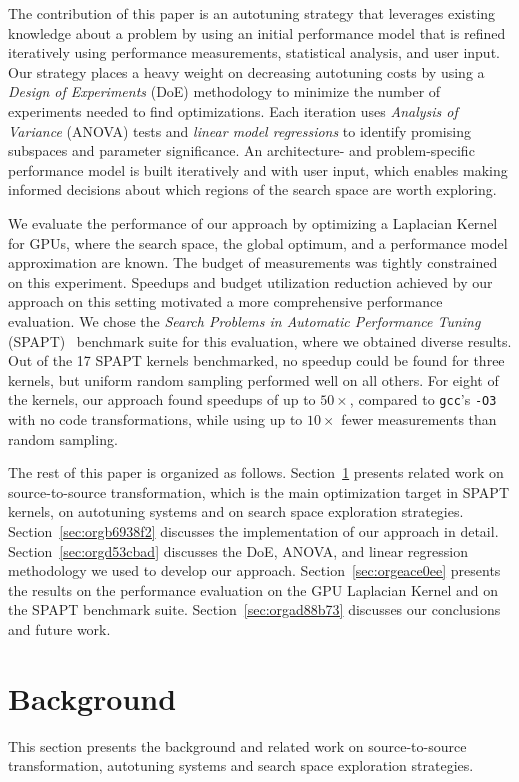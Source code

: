 \documentclass[conference]{IEEEtran}
\begin{document}
The contribution of this paper is an autotuning strategy that leverages existing
knowledge about a problem by using  an initial performance model that is refined
iteratively  using  performance  measurements, statistical  analysis,  and  user
input. Our  strategy places  a heavy  weight on  decreasing autotuning  costs by
using  a \emph{Design  of  Experiments} (DoE)  methodology to  minimize  the number  of
experiments  needed  to find  optimizations.  Each  iteration uses  \emph{Analysis  of
Variance}  (ANOVA)  tests and  \emph{linear  model  regressions} to  identify  promising
subspaces  and parameter  significance.  An  architecture- and  problem-specific
performance model is built iteratively and with user input, which enables making
informed decisions about which regions of the search space are worth exploring.

We evaluate the performance of our approach by optimizing a Laplacian Kernel for
GPUs,  where the  search  space, the  global optimum,  and  a performance  model
approximation are known.  The budget of measurements was  tightly constrained on
this  experiment. Speedups  and  budget utilization  reduction  achieved by  our
approach on this setting motivated  a more comprehensive performance evaluation.
We    chose   the    \emph{Search   Problems    in   Automatic    Performance   Tuning}
(SPAPT)~\cite{balaprakash2012spapt} benchmark  suite for this  evaluation, where
we obtained diverse results. Out of the 17 SPAPT kernels benchmarked, no speedup
could be found for three kernels,  but uniform random sampling performed well on
all others.  For eight  of the  kernels, our  approach found  speedups of  up to
\(50\times\), compared  to \texttt{gcc}'s \texttt{-O3}  with no code  transformations, while using  up to
\(10\times\) fewer measurements than random sampling.

The  rest of  this paper  is organized  as follows.  Section~\ref{sec:org9b6520b} presents
related work on source-to-source transformation,  which is the main optimization
target in SPAPT  kernels, on autotuning systems and on  search space exploration
strategies.  Section~\ref{sec:orgb6938f2}   discusses  the
implementation  of  our  approach   in  detail.  Section~\ref{sec:orgd53cbad}
discusses the DoE,  ANOVA, and linear regression methodology we  used to develop
our  approach.  Section~\ref{sec:orgeace0ee}  presents  the  results  on  the
performance evaluation  on the GPU Laplacian  Kernel and on the  SPAPT benchmark
suite. Section~\ref{sec:orgad88b73} discusses our conclusions and future work.
\section{Background}
\label{sec:org9b6520b}
This  section  presents the  background  and  related work  on  source-to-source
transformation, autotuning systems and search space exploration strategies.
\end{document}
